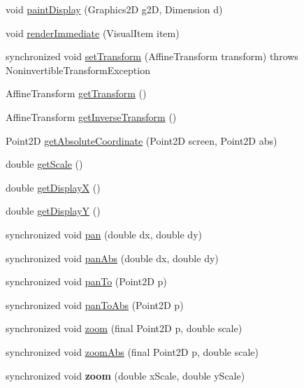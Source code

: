 \begin{DoxyCompactItemize}
\item 
void \hyperlink{classprefuse_1_1_display_a59ca67442b8f3c80fa3f463e7b669fd5}{paint\-Display} (\-Graphics2\-D g2\-D, \-Dimension d)
\item 
void \hyperlink{classprefuse_1_1_display_a045cd78a5bd2acb207d4f72bfff51498}{render\-Immediate} (\-Visual\-Item item)
\item 
synchronized void \hyperlink{classprefuse_1_1_display_ad66212a1b069f86248348dbd7b122dee}{set\-Transform} (\-Affine\-Transform transform)  throws Noninvertible\-Transform\-Exception     
\item 
\-Affine\-Transform \hyperlink{classprefuse_1_1_display_a2895fa91162a982f12102215d0983d3f}{get\-Transform} ()
\item 
\-Affine\-Transform \hyperlink{classprefuse_1_1_display_ac38422394b0dea923c477c8a9ebf4611}{get\-Inverse\-Transform} ()
\item 
\-Point2\-D \hyperlink{classprefuse_1_1_display_a64f2fa148db1032b95604b747dfe02b8}{get\-Absolute\-Coordinate} (\-Point2\-D screen, \-Point2\-D abs)
\item 
double \hyperlink{classprefuse_1_1_display_a74ccaf48b365862bf55acfb039e97bed}{get\-Scale} ()
\item 
double \hyperlink{classprefuse_1_1_display_af8262cbf60292b5e61bc9a5b4d661ea0}{get\-Display\-X} ()
\item 
double \hyperlink{classprefuse_1_1_display_ae5f1b89172bcfbf14cfc38295c2eea8d}{get\-Display\-Y} ()
\item 
synchronized void \hyperlink{classprefuse_1_1_display_a065163ab976fc2b8c7884373af759895}{pan} (double dx, double dy)
\item 
synchronized void \hyperlink{classprefuse_1_1_display_ae0b589ec47b4a1ca403d3f22112fd80d}{pan\-Abs} (double dx, double dy)
\item 
synchronized void \hyperlink{classprefuse_1_1_display_a375c9aa6e170b7219b96d290fdb69b6b}{pan\-To} (\-Point2\-D p)
\item 
synchronized void \hyperlink{classprefuse_1_1_display_a6e488baa70b8daaca88094b87955ad4e}{pan\-To\-Abs} (\-Point2\-D p)
\item 
synchronized void \hyperlink{classprefuse_1_1_display_ae395fe84a34715e6d5bd000ed3057872}{zoom} (final \-Point2\-D p, double scale)
\item 
synchronized void \hyperlink{classprefuse_1_1_display_afb21801d4eb7851cb1e12448da22297f}{zoom\-Abs} (final \-Point2\-D p, double scale)
\item 
\hypertarget{classprefuse_1_1_display_a50e19c8c482879b3180fcc003c5e8c0c}{synchronized void {\bfseries zoom} (double x\-Scale, double y\-Scale)}\label{classprefuse_1_1_display_a50e19c8c482879b3180fcc003c5e8c0c}


\end{DoxyCompactItemize}

